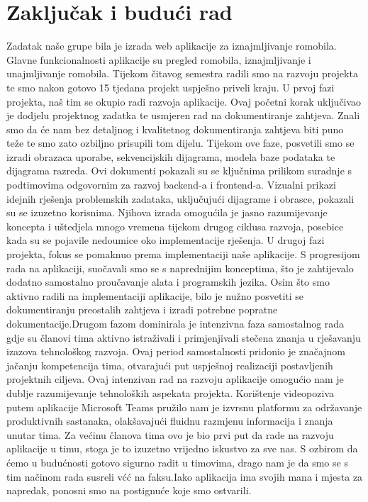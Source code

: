 \chapter{Zaključak i budući rad}
		
		\indent Zadatak naše grupe bila je izrada web aplikacije za iznajmljivanje romobila. Glavne funkcionalnosti aplikacije su pregled romobila, iznajmljivanje i unajmljivanje romobila. Tijekom čitavog semestra radili smo na razvoju projekta te smo nakon gotovo 15 tjedana projekt uspješno priveli kraju.\newline
		\indent U prvoj fazi projekta, naš tim se okupio radi razvoja aplikacije. Ovaj početni korak uključivao je dodjelu projektnog zadatka te usmjeren rad na dokumentiranje zahtjeva. Znali smo da će nam bez detaljnog i kvalitetnog dokumentiranja zahtjeva biti puno teže te smo zato ozbiljno prisupili tom dijelu. Tijekom ove faze, posvetili smo se izradi obrazaca uporabe, sekvencijskih dijagrama, modela baze podataka te dijagrama razreda. Ovi dokumenti pokazali su se ključnima prilikom suradnje s podtimovima odgovornim za razvoj backend-a i frontend-a. Vizualni prikazi idejnih rješenja problemskih zadataka, uključujući dijagrame i obrasce, pokazali su se izuzetno korisnima. Njihova izrada omogućila je jasno razumijevanje koncepta i uštedjela mnogo vremena tijekom drugog ciklusa razvoja, posebice kada su se pojavile nedoumice oko implementacije rješenja.\newline
		\indent U drugoj fazi projekta, fokus se pomaknuo prema implementaciji naše aplikacije. S progresijom rada na aplikaciji, suočavali smo se s naprednijim konceptima, što je zahtijevalo dodatno samostalno proučavanje alata i programskih jezika. Osim što smo aktivno radili na implementaciji aplikacije, bilo je nužno posvetiti se dokumentiranju preostalih zahtjeva i izradi potrebne popratne dokumentacije.Drugom fazom dominirala je intenzivna faza samostalnog rada gdje su članovi tima aktivno istraživali i primjenjivali stečena znanja u rješavanju izazova tehnološkog razvoja. Ovaj period samostalnosti pridonio je značajnom jačanju kompetencija tima, otvarajući put uspješnoj realizaciji postavljenih projektnih ciljeva. Ovaj intenzivan rad na razvoju aplikacije omogućio nam je dublje razumijevanje tehnoloških aspekata projekta.\newline
		\indent Korištenje videopoziva putem aplikacije Microsoft Teams pružilo nam je izvrsnu platformu za održavanje produktivnih sastanaka, olakšavajući fluidnu razmjenu informacija i znanja unutar tima.\newline
		\indent Za većinu članova tima ovo je bio prvi put da rade na razvoju aplikacije u timu, stoga je to izuzetno vrijedno iskustvo za sve nas. S ozbirom da ćemo u budućnosti gotovo sigurno radit u timovima, drago nam je da smo se s tim načinom rada susreli vćć na faksu.Iako aplikacija ima svojih mana i mjesta za napredak, ponosni smo na postignuće koje smo ostvarili. 